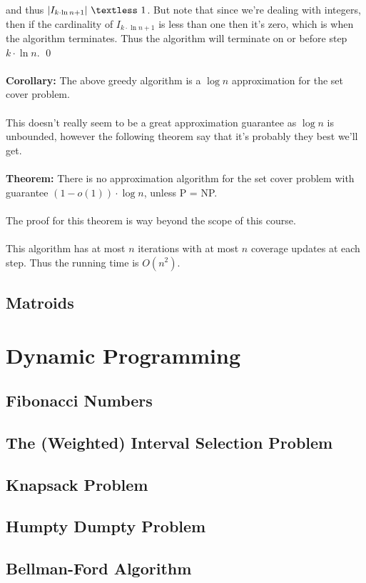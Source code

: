 \documentclass{article}
\newcommand{\lt}{\textless}
\newcommand{\x}{\cdot}
\newcommand{\thm}{\textbf{Theorem: }}
\newcommand{\cor}{\textbf{Corollary: }}
\begin{document}
and thus $|I_{k\x \ln n +1}|\ \lt\ 1$. But note that since we're dealing with integers, then if the cardinality of $I_{k\x \ln n +1}$ is less than one then it's zero, which is when the algorithm terminates. Thus the algorithm will terminate on or before step $k\x \ln n$.
\qed\\\\
\cor The above greedy algorithm is a $\log n$ approximation for the set cover problem.\\\\
This doesn't really seem to be a great approximation guarantee as $\log n$ is unbounded, however the following theorem say that it's probably they best we'll get.\\\\
\thm There is no approximation algorithm for the set cover problem with guarantee $(1 - o(1))\x \log n$, unless P = NP.\\\\
The proof for this theorem is way beyond the scope of this course.\\\\
This algorithm has at most $n$ iterations with at most $n$ coverage updates at each step. Thus the running time is $O(n^2)$.
\subsection{Matroids}
\newpage


\section{Dynamic Programming}
\subsection{Fibonacci Numbers}
\subsection{The (Weighted) Interval Selection Problem}
\subsection{Knapsack Problem}
\subsection{Humpty Dumpty Problem}
\subsection{Bellman-Ford Algorithm}
\end{document}
